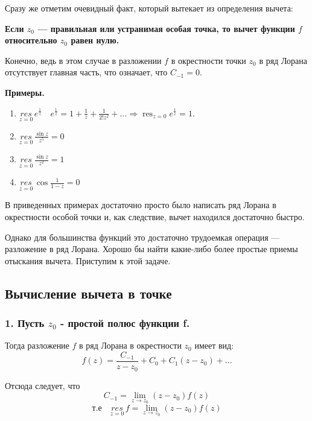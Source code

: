 \documentclass[a4paper, 12pt]{report}
\DeclareMathOperator*{\res}{res}
\begin{document}
\par\bigskip
Сразу же отметим очевидный факт, который вытекает из определения вычета:

\textbf{Если $z_0$ --- правильная или устранимая особая точка, то вычет функции $f$ относительно $z_0$ равен нулю. }
\par\bigskip
Конечно, ведь в этом случае в разложении $f$ в окрестности точки $z_0$ в ряд Лорана отсутствует главная часть, что означает, что $C_{-1} = 0$.

\par\bigskip
\textbf{Примеры.}
\begin{enumerate}
    \item $\overset{}{\underset{z = 0}{res}}\, e^{\frac{1}{z}} \quad e^{\frac{1}{z}} = 1 + \frac{1}{z} + \frac{1}{2!z^2} + ... \Rightarrow \displaystyle \res_{z=0}  e^{\frac{1}{z}} = 1.$
    \item $\overset{}{\underset{z = 0}{res}}\, \frac{\sin z}{z^5} = 0 $
    \item $\overset{}{\underset{z = 0}{res}}\, \frac{\sin z}{z^2} = 1 $
    \item $\overset{}{\underset{z = 0}{res}}\, \cos \frac{1}{1-z} = 0 $
\end{enumerate}


В приведенных примерах достаточно просто было написать ряд Лорана в окрестности особой точки и, как следствие, вычет находился достаточно быстро.

Однако для большинства функций это достаточно трудоемкая операция --- разложение в ряд Лорана. Хорошо бы найти какие-либо более простые приемы отыскания вычета. Приступим к этой задаче.

\subsection{Вычисление вычета в точке}

\subsubsection*{1.\hspace{1 mm} Пусть $z_0$ - простой полюс функции f.}

Тогда разложение $f$ в ряд Лорана в окрестности $z_0$ имеет вид:
$$f(z) = \frac{C_{-1}}{z-z_0} + C_0 + C_1(z-z_0) + ... $$

Отсюда следует, что 
$$C_{-1} =\displaystyle \lim_{z \to z_0}(z-z_0)f(z)  $$
$$ \text{т.е}\quad \overset{}{\underset{z = 0}{res}}\, f = \lim_{z \to z_0}(z-z_0)f(z)$$
\end{document}
